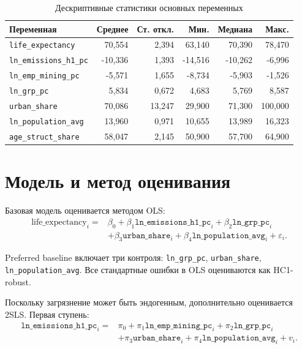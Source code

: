 \documentclass[10pt,a4paper]{article}
\begin{document}
\begin{table}[H]
\centering
\caption{Дескриптивные статистики основных переменных}
\label{tab:desc}
\begin{tabular}{lrrrrr}
\toprule
\textbf{Переменная} & \textbf{Среднее} & \textbf{Ст. откл.} & \textbf{Мин.} & \textbf{Медиана} & \textbf{Макс.} \\
\midrule
\texttt{life\_expectancy}       & 70{,}554 & 2{,}394 & 63{,}140 & 70{,}390 & 78{,}470 \\
\texttt{ln\_emissions\_h1\_pc}  & -10{,}336 & 1{,}393 & -14{,}516 & -10{,}262 & -6{,}996 \\
\texttt{ln\_emp\_mining\_pc}    & -5{,}571 & 1{,}655 & -8{,}734 & -5{,}903 & -1{,}526 \\
\texttt{ln\_grp\_pc}            & 5{,}834 & 0{,}672 & 4{,}683 & 5{,}769 & 8{,}587 \\
\texttt{urban\_share}           & 70{,}086 & 13{,}247 & 29{,}900 & 71{,}300 & 100{,}000 \\
\texttt{ln\_population\_avg}    & 13{,}960 & 0{,}971 & 10{,}655 & 13{,}989 & 16{,}323 \\
\texttt{age\_struct\_share}     & 58{,}047 & 2{,}145 & 50{,}900 & 57{,}700 & 64{,}900 \\
\bottomrule
\end{tabular}
\end{table}

\section{Модель и метод оценивания}

Базовая модель оценивается методом OLS:
\begin{equation}
\label{eq:ols}
\begin{aligned}
\text{life\_expectancy}_i ={}& \beta_0+\beta_1\texttt{ln\_emissions\_h1\_pc}_i+\beta_2\texttt{ln\_grp\_pc}_i\\
&+\beta_3\texttt{urban\_share}_i+\beta_4\texttt{ln\_population\_avg}_i+\varepsilon_i .
\end{aligned}
\end{equation}

Preferred baseline включает три контроля: \texttt{ln\_grp\_pc}, \texttt{urban\_share}, \texttt{ln\_population\_avg}. Все стандартные ошибки в OLS оцениваются как HC1-robust.

Поскольку загрязнение может быть эндогенным, дополнительно оценивается 2SLS. Первая ступень:
\begin{equation}
\label{eq:first}
\begin{aligned}
\texttt{ln\_emissions\_h1\_pc}_i ={}& \pi_0+\pi_1\texttt{ln\_emp\_mining\_pc}_i+\pi_2\texttt{ln\_grp\_pc}_i\\
&+\pi_3\texttt{urban\_share}_i+\pi_4\texttt{ln\_population\_avg}_i+v_i .
\end{aligned}
\end{equation}
\end{document}
